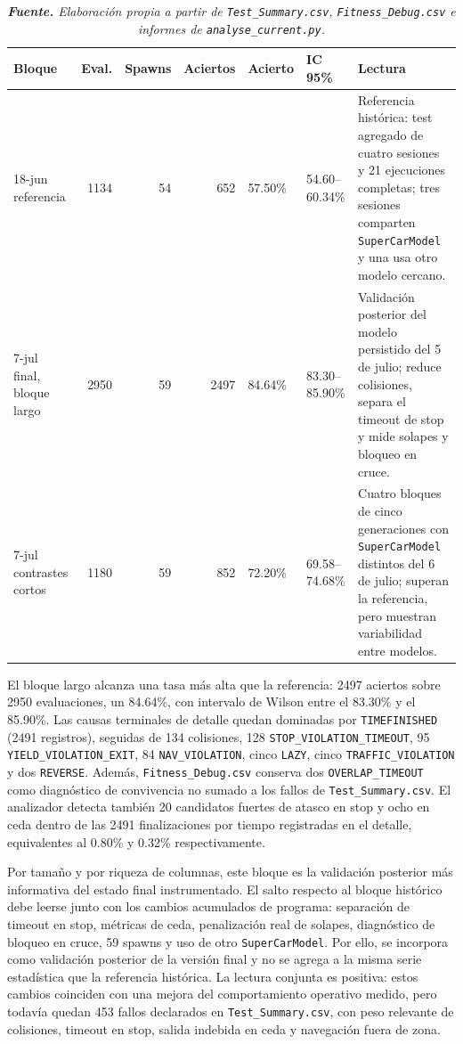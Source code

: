 \begin{table}[H]
\centering
\caption{Comparación entre la referencia del 18 de junio y la validación posterior del 7 de julio.}%
\label{tab:validacion-posterior}
\footnotesize
\begin{tabularx}{0.98\textwidth}{L{2.2cm}rrrL{1.25cm}L{2.25cm}>{\raggedright\arraybackslash}X}
\toprule
\textbf{Bloque} & \textbf{Eval.} & \textbf{Spawns} & \textbf{Aciertos} & \textbf{Acierto} & \textbf{IC 95\%} & \textbf{Lectura}\\
-jun referencia & 1134 & 54 & 652 & 57.50\% & 54.60--60.34\% & Referencia histórica: test agregado de cuatro sesiones y 21 ejecuciones completas; tres sesiones comparten \texttt{SuperCarModel} y una usa otro modelo cercano.\\
7-jul final, bloque largo & 2950 & 59 & 2497 & 84.64\% & 83.30--85.90\% & Validación posterior del modelo persistido del 5 de julio; reduce colisiones, separa el timeout de stop y mide solapes y bloqueo en cruce.\\
7-jul contrastes cortos & 1180 & 59 & 852 & 72.20\% & 69.58--74.68\% & Cuatro bloques de cinco generaciones con \texttt{SuperCarModel} distintos del 6 de julio; superan la referencia, pero muestran variabilidad entre modelos.\\
\bottomrule
\end{tabularx}
\caption*{\textit{\textbf{Fuente.} Elaboración propia a partir de \texttt{Test\_Summary.csv}, \texttt{Fitness\_Debug.csv} e informes de \texttt{analyse\_current.py}.}}
\end{table}

El bloque largo alcanza una tasa más alta que la referencia: 2497 aciertos sobre 2950 evaluaciones, un 84.64\%, con intervalo de Wilson entre el 83.30\% y el 85.90\%. Las causas terminales de detalle quedan dominadas por \texttt{TIMEFINISHED} (2491 registros), seguidas de 134 colisiones, 128 \texttt{STOP\_VIOLATION\_TIMEOUT}, 95 \texttt{YIELD\_VIOLATION\_EXIT}, 84 \texttt{NAV\_VIOLATION}, cinco \texttt{LAZY}, cinco \texttt{TRAFFIC\_VIOLATION} y dos \texttt{REVERSE}. Además, \texttt{Fitness\_Debug.csv} conserva dos \texttt{OVERLAP\_TIMEOUT} como diagnóstico de convivencia no sumado a los fallos de \texttt{Test\_Summary.csv}. El analizador detecta también 20 candidatos fuertes de atasco en stop y ocho en ceda dentro de las 2491 finalizaciones por tiempo registradas en el detalle, equivalentes al 0.80\% y 0.32\% respectivamente.

Por tamaño y por riqueza de columnas, este bloque es la validación posterior más informativa del estado final instrumentado. El salto respecto al bloque histórico debe leerse junto con los cambios acumulados de programa: separación de timeout en stop, métricas de ceda, penalización real de solapes, diagnóstico de bloqueo en cruce, 59 spawns y uso de otro \texttt{SuperCarModel}. Por ello, se incorpora como validación posterior de la versión final y no se agrega a la misma serie estadística que la referencia histórica. La lectura conjunta es positiva: estos cambios coinciden con una mejora del comportamiento operativo medido, pero todavía quedan 453 fallos declarados en \texttt{Test\_Summary.csv}, con peso relevante de colisiones, timeout en stop, salida indebida en ceda y navegación fuera de zona.

